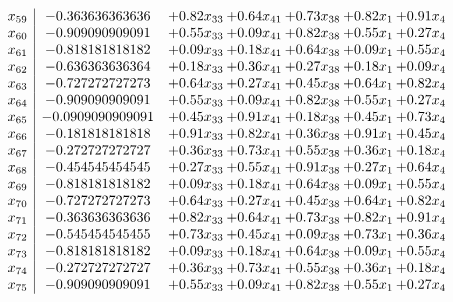 \documentclass[8pt]{article}
\begin{document}
\[\begin{array}{c| c c@{\hskip 2pt} c@{\hskip 2pt} c@{\hskip 2pt} c@{\hskip 2pt} c@{\hskip 2pt} }
 x_{59}   &  -0.363636363636 & +  0.82 x_{33} & +  0.64 x_{41} & +  0.73 x_{38} & +  0.82 x_{1} & +  0.91 x_{4}\\
 x_{60}   &  -0.909090909091 & +  0.55 x_{33} & +  0.09 x_{41} & +  0.82 x_{38} & +  0.55 x_{1} & +  0.27 x_{4}\\
 x_{61}   &  -0.818181818182 & +  0.09 x_{33} & +  0.18 x_{41} & +  0.64 x_{38} & +  0.09 x_{1} & +  0.55 x_{4}\\
 x_{62}   &  -0.636363636364 & +  0.18 x_{33} & +  0.36 x_{41} & +  0.27 x_{38} & +  0.18 x_{1} & +  0.09 x_{4}\\
 x_{63}   &  -0.727272727273 & +  0.64 x_{33} & +  0.27 x_{41} & +  0.45 x_{38} & +  0.64 x_{1} & +  0.82 x_{4}\\
 x_{64}   &  -0.909090909091 & +  0.55 x_{33} & +  0.09 x_{41} & +  0.82 x_{38} & +  0.55 x_{1} & +  0.27 x_{4}\\
 x_{65}   &  -0.0909090909091 & +  0.45 x_{33} & +  0.91 x_{41} & +  0.18 x_{38} & +  0.45 x_{1} & +  0.73 x_{4}\\
 x_{66}   &  -0.181818181818 & +  0.91 x_{33} & +  0.82 x_{41} & +  0.36 x_{38} & +  0.91 x_{1} & +  0.45 x_{4}\\
 x_{67}   &  -0.272727272727 & +  0.36 x_{33} & +  0.73 x_{41} & +  0.55 x_{38} & +  0.36 x_{1} & +  0.18 x_{4}\\
 x_{68}   &  -0.454545454545 & +  0.27 x_{33} & +  0.55 x_{41} & +  0.91 x_{38} & +  0.27 x_{1} & +  0.64 x_{4}\\
 x_{69}   &  -0.818181818182 & +  0.09 x_{33} & +  0.18 x_{41} & +  0.64 x_{38} & +  0.09 x_{1} & +  0.55 x_{4}\\
 x_{70}   &  -0.727272727273 & +  0.64 x_{33} & +  0.27 x_{41} & +  0.45 x_{38} & +  0.64 x_{1} & +  0.82 x_{4}\\
 x_{71}   &  -0.363636363636 & +  0.82 x_{33} & +  0.64 x_{41} & +  0.73 x_{38} & +  0.82 x_{1} & +  0.91 x_{4}\\
 x_{72}   &  -0.545454545455 & +  0.73 x_{33} & +  0.45 x_{41} & +  0.09 x_{38} & +  0.73 x_{1} & +  0.36 x_{4}\\
 x_{73}   &  -0.818181818182 & +  0.09 x_{33} & +  0.18 x_{41} & +  0.64 x_{38} & +  0.09 x_{1} & +  0.55 x_{4}\\
 x_{74}   &  -0.272727272727 & +  0.36 x_{33} & +  0.73 x_{41} & +  0.55 x_{38} & +  0.36 x_{1} & +  0.18 x_{4}\\
 x_{75}   &  -0.909090909091 & +  0.55 x_{33} & +  0.09 x_{41} & +  0.82 x_{38} & +  0.55 x_{1} & +  0.27 x_{4}\\

\end{array}\]
\end{document}
